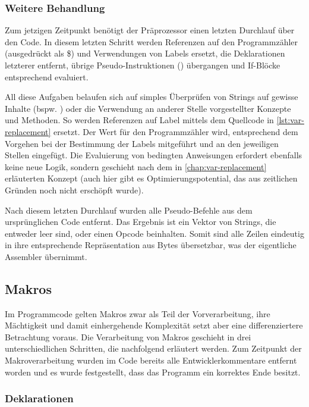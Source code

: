 \subsubsection{Weitere Behandlung}

Zum jetzigen Zeitpunkt benötigt der Präprozessor einen letzten Durchlauf über den Code. In diesem letzten Schritt werden Referenzen auf den Programmzähler (ausgedrückt als \glqq \$\grqq) und Verwendungen von Labels ersetzt, die Deklarationen letzterer entfernt, übrige Pseudo-Instruktionen () übergangen und If-Blöcke entsprechend evaluiert.

All diese Aufgaben belaufen sich auf simples Überprüfen von Strings auf gewisse Inhalte (bspw. ) oder die Verwendung an anderer Stelle vorgestellter Konzepte und Methoden. So werden Referenzen auf Label mittels dem Quellcode in \ref{lst:var-replacement} ersetzt. Der Wert für den Programmzähler wird, entsprechend dem Vorgehen bei der Bestimmung der Labels mitgeführt und an den jeweiligen Stellen eingefügt. Die Evaluierung von bedingten Anweisungen erfordert ebenfalls keine neue Logik, sondern geschieht nach dem in \ref{chap:var-replacement} erläuterten Konzept (auch hier gibt es Optimierungspotential, das aus zeitlichen Gründen noch nicht erschöpft wurde).

Nach diesem letzten Durchlauf wurden alle Pseudo-Befehle aus dem ursprünglichen Code entfernt. Das Ergebnis ist ein Vektor von Strings, die entweder leer sind, oder einen Opcode beinhalten. Somit sind alle Zeilen eindeutig in ihre entsprechende Repräsentation aus Bytes übersetzbar, was der eigentliche Assembler übernimmt.

\subsection{Makros}\label{chap:macros}

Im Programmcode gelten Makros zwar als Teil der Vorverarbeitung, ihre Mächtigkeit und damit einhergehende Komplexität setzt aber eine differenziertere Betrachtung voraus. Die Verarbeitung von Makros geschieht in drei unterschiedlichen Schritten, die nachfolgend erläutert werden. Zum Zeitpunkt der Makroverarbeitung wurden im Code bereits alle Entwicklerkommentare entfernt worden und es wurde festgestellt, dass das Programm ein korrektes Ende besitzt.

\subsubsection{Deklarationen}

